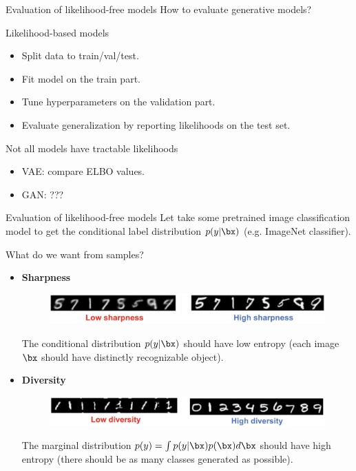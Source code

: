 \begin{frame}{Evaluation of likelihood-free models}
	How to evaluate generative models?
	\begin{block}{Likelihood-based models}
		\begin{itemize}
			\item Split data to train/val/test.
			\item Fit model on the train part.
			\item Tune hyperparameters on the validation part.
			\item Evaluate generalization by reporting likelihoods on the test set.
		\end{itemize}
	\end{block}
	\begin{block}{Not all models have tractable likelihoods}
		\begin{itemize}
			\item VAE: compare ELBO values.
			\item GAN: ???
		\end{itemize}
	\end{block}
\end{frame}
\begin{frame}{Evaluation of likelihood-free models}
	Let take some pretrained image classification model to get the conditional label distribution $p(y | \bx)$ (e.g. ImageNet classifier).
	\begin{block}{What do we want from samples?}
		\begin{itemize}
			\item \textbf{Sharpness}
			\begin{figure}
				\centering
				\includegraphics[width=0.9\linewidth]{figs/sharpness}
			\end{figure}
			The conditional distribution $p(y | \bx)$ should have low entropy (each image $\bx$ should have distinctly recognizable object).
			\item \textbf{Diversity}
			\begin{figure}
				\centering
				\includegraphics[width=0.9\linewidth]{figs/diversity}
			\end{figure}
			The marginal distribution $p(y) = \int p(y | \bx) p(\bx) d \bx$ should have high entropy (there should be as many classes generated as possible).
		\end{itemize}
	\end{block}
\end{frame}
